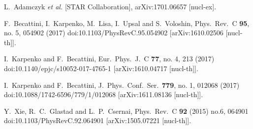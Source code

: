 \documentclass[preprint,aps,showpacs,nofootinbib,superscriptaddress,preprintnumbers,epsf,psf]{revtex4}
\begin{document}
\begin{thebibliography}{99}
  L.~Adamczyk {\it et al.} [STAR Collaboration],
  arXiv:1701.06657 [nucl-ex].







  F.~Becattini, I.~Karpenko, M.~Lisa, I.~Upsal and S.~Voloshin,
  Phys.\ Rev.\ C {\bf 95}, no. 5, 054902 (2017)
  doi:10.1103/PhysRevC.95.054902
  [arXiv:1610.02506 [nucl-th]].







  I.~Karpenko and F.~Becattini,
  Eur.\ Phys.\ J.\ C {\bf 77}, no. 4, 213 (2017)
  doi:10.1140/epjc/s10052-017-4765-1
  [arXiv:1610.04717 [nucl-th]].


  I.~Karpenko and F.~Becattini,
  J.\ Phys.\ Conf.\ Ser.\  {\bf 779}, no. 1, 012068 (2017)
  doi:10.1088/1742-6596/779/1/012068
  [arXiv:1611.08136 [nucl-th]].




  Y.~Xie, R.~C.~Glastad and L.~P.~Csernai,
  Phys.\ Rev.\ C {\bf 92} (2015) no.6,  064901
  doi:10.1103/PhysRevC.92.064901
  [arXiv:1505.07221 [nucl-th]].




\end{thebibliography}
\end{document}
